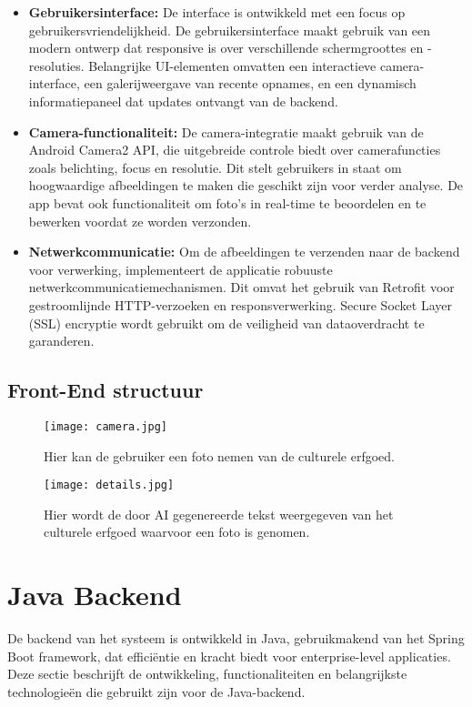 \begin{itemize}
    \item \textbf{Gebruikersinterface:} De interface is ontwikkeld met een focus op gebruikersvriendelijkheid. De gebruikersinterface maakt gebruik van een modern ontwerp dat responsive is over verschillende schermgroottes en -resoluties. Belangrijke UI-elementen omvatten een interactieve camera-interface, een galerijweergave van recente opnames, en een dynamisch informatiepaneel dat updates ontvangt van de backend.
    
    \item \textbf{Camera-functionaliteit:} De camera-integratie maakt gebruik van de Android Camera2 API, die uitgebreide controle biedt over camerafuncties zoals belichting, focus en resolutie. Dit stelt gebruikers in staat om hoogwaardige afbeeldingen te maken die geschikt zijn voor verder analyse. De app bevat ook functionaliteit om foto's in real-time te beoordelen en te bewerken voordat ze worden verzonden.
    
    \item \textbf{Netwerkcommunicatie:} Om de afbeeldingen te verzenden naar de backend voor verwerking, implementeert de applicatie robuuste netwerkcommunicatiemechanismen. Dit omvat het gebruik van Retrofit voor gestroomlijnde HTTP-verzoeken en responsverwerking. Secure Socket Layer (SSL) encryptie wordt gebruikt om de veiligheid van dataoverdracht te garanderen.
    
\end{itemize}

\subsection{Front-End structuur}

\begin{figure}[h!]
    \centering
    \texttt{[image: camera.jpg]}
    \captionsetup{justification=centering}
    \caption{Hier kan de gebruiker een foto nemen van de culturele erfgoed.}
    \label{fig:FrontEndCamera}
\end{figure}
\begin{figure}[h!]
    \centering
    \texttt{[image: details.jpg]}
    \captionsetup{justification=centering}
    \caption{Hier wordt de door AI gegenereerde tekst weergegeven van het culturele erfgoed waarvoor een foto is genomen.}
    \label{fig:FrontEndCameraDetails}
\end{figure}
\pagebreak
\section{Java Backend}
De backend van het systeem is ontwikkeld in Java, gebruikmakend van het Spring Boot framework, dat efficiëntie en kracht biedt voor enterprise-level applicaties. Deze sectie beschrijft de ontwikkeling, functionaliteiten en belangrijkste technologieën die gebruikt zijn voor de Java-backend.

